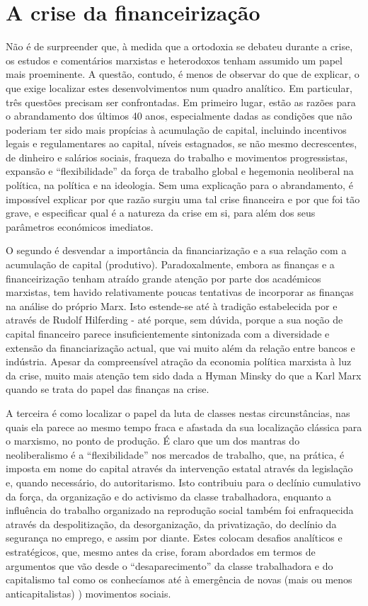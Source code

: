 \section{A crise da financeirização}
 \par 
Não é de surpreender que, à medida que a ortodoxia se debateu durante a crise, os estudos e comentários marxistas e heterodoxos tenham assumido um papel mais proeminente. A questão, contudo, é menos de observar do que de explicar, o que exige localizar estes desenvolvimentos num quadro analítico. Em particular, três questões precisam ser confrontadas. Em primeiro lugar, estão as razões para o abrandamento dos últimos {\color{blue}40} anos, especialmente dadas as condições que não poderiam ter sido mais propícias à acumulação de capital, incluindo incentivos legais e regulamentares ao capital, níveis estagnados, se não mesmo decrescentes, de dinheiro e salários sociais, fraqueza do trabalho e movimentos progressistas, expansão e “flexibilidade” da força de trabalho global e hegemonia neoliberal na política, na política e na ideologia. Sem uma explicação para o abrandamento, é impossível explicar por que razão surgiu uma tal crise financeira e por que foi tão grave, e especificar qual é a natureza da crise em si, para além dos seus parâmetros económicos imediatos.
 \par 
O segundo é desvendar a importância da financiarização e a sua relação com a acumulação de capital (produtivo). Paradoxalmente, embora as finanças e a financeirização tenham atraído grande atenção por parte dos académicos marxistas, tem havido relativamente poucas tentativas de incorporar as finanças na análise do próprio Marx. Isto estende-se até à tradição estabelecida por e através de Rudolf Hilferding - até porque, sem dúvida, porque a sua noção de capital financeiro parece insuficientemente sintonizada com a diversidade e extensão da financiarização actual, que vai muito além da relação entre bancos e indústria. Apesar da compreensível atração da economia política marxista à luz da crise, muito mais atenção tem sido dada a Hyman Minsky do que a Karl Marx quando se trata do papel das finanças na crise.
 \par 
A terceira é como localizar o papel da luta de classes nestas circunstâncias, nas quais ela parece ao mesmo tempo fraca e afastada da sua localização clássica para o marxismo, no ponto de produção. É claro que um dos mantras do neoliberalismo é a “flexibilidade” nos mercados de trabalho, que, na prática, é imposta em nome do capital através da intervenção estatal através da legislação e, quando necessário, do autoritarismo. Isto contribuiu para o declínio cumulativo da força, da organização e do activismo da classe trabalhadora, enquanto a influência do trabalho organizado na reprodução social também foi enfraquecida através da despolitização, da desorganização, da privatização, do declínio da segurança no emprego, e assim por diante. Estes colocam desafios analíticos e estratégicos, que, mesmo antes da crise, foram abordados em termos de argumentos que vão desde o “desaparecimento” da classe trabalhadora e do capitalismo tal como os conhecíamos até à emergência de novas (mais ou menos anticapitalistas) ) movimentos sociais.
